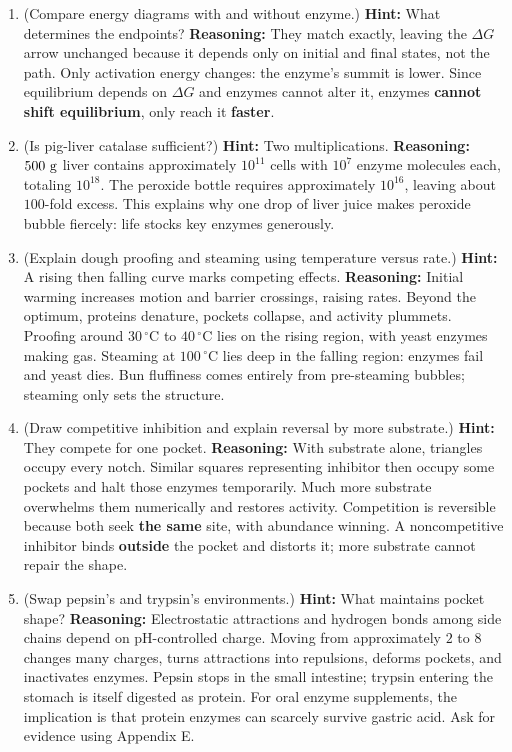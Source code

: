 \begin{enumerate}[itemsep=3pt]
\item (Compare energy diagrams with and without enzyme.) \textbf{Hint:} What determines the endpoints? \textbf{Reasoning:} They match exactly, leaving the $\Delta G$ arrow unchanged because it depends only on initial and final states, not the path. Only activation energy changes: the enzyme's summit is lower. Since equilibrium depends on $\Delta G$ and enzymes cannot alter it, enzymes \textbf{cannot shift equilibrium}, only reach it \textbf{faster}.
\item (Is pig-liver catalase sufficient?) \textbf{Hint:} Two multiplications. \textbf{Reasoning:} $500\ \mathrm{g}$ liver contains approximately $10^{11}$ cells with $10^{7}$ enzyme molecules each, totaling $10^{18}$. The peroxide bottle requires approximately $10^{16}$, leaving about $100$-fold excess. This explains why one drop of liver juice makes peroxide bubble fiercely: life stocks key enzymes generously.
\item (Explain dough proofing and steaming using temperature versus rate.) \textbf{Hint:} A rising then falling curve marks competing effects. \textbf{Reasoning:} Initial warming increases motion and barrier crossings, raising rates. Beyond the optimum, proteins denature, pockets collapse, and activity plummets. Proofing around $30\,^{\circ}\mathrm{C}$ to $40\,^{\circ}\mathrm{C}$ lies on the rising region, with yeast enzymes making gas. Steaming at $100\,^{\circ}\mathrm{C}$ lies deep in the falling region: enzymes fail and yeast dies. Bun fluffiness comes entirely from pre-steaming bubbles; steaming only sets the structure.
\item (Draw competitive inhibition and explain reversal by more substrate.) \textbf{Hint:} They compete for one pocket. \textbf{Reasoning:} With substrate alone, triangles occupy every notch. Similar squares representing inhibitor then occupy some pockets and halt those enzymes temporarily. Much more substrate overwhelms them numerically and restores activity. Competition is reversible because both seek \textbf{the same} site, with abundance winning. A noncompetitive inhibitor binds \textbf{outside} the pocket and distorts it; more substrate cannot repair the shape.
\item (Swap pepsin's and trypsin's environments.) \textbf{Hint:} What maintains pocket shape? \textbf{Reasoning:} Electrostatic attractions and hydrogen bonds among side chains depend on pH-controlled charge. Moving from approximately $2$ to $8$ changes many charges, turns attractions into repulsions, deforms pockets, and inactivates enzymes. Pepsin stops in the small intestine; trypsin entering the stomach is itself digested as protein. For oral enzyme supplements, the implication is that protein enzymes can scarcely survive gastric acid. Ask for evidence using Appendix E.

\end{enumerate}
